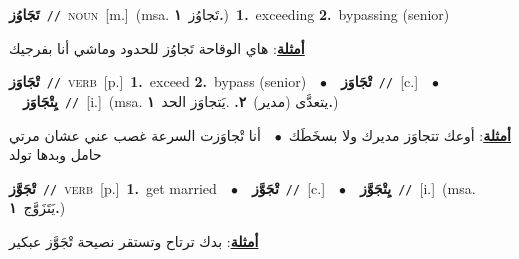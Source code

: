 \documentclass[10pt,a4paper,twoside]{article} %
\begin{document}
\begin{multicols}{2}
{\setlength\topsep{0pt}\textbf{\foreignlanguage{arabic}{تَجَاوُز}}\ {\color{gray}\texttt{//}\color{black}}\ \textsc{noun}\ [m.]\ \color{gray}(msa. \foreignlanguage{arabic}{تَجاوُز}~\foreignlanguage{arabic}{\textbf{١.}})\color{black}\ \textbf{1.}~exceeding  \textbf{2.}~bypassing (senior)\  \begin{flushright}\color{gray}\foreignlanguage{arabic}{\textbf{\underline{\foreignlanguage{arabic}{أمثلة}}}: هاي الوقاحة تَجاوُز للحدود وماشي أنا بفرجيك}\end{flushright}\color{black}} \vspace{2mm}

{\setlength\topsep{0pt}\textbf{\foreignlanguage{arabic}{تْجَاوَز}}\ {\color{gray}\texttt{//}\color{black}}\ \textsc{verb}\ [p.]\ \textbf{1.}~exceed  \textbf{2.}~bypass (senior)\ \ $\bullet$\ \ \setlength\topsep{0pt}\textbf{\foreignlanguage{arabic}{تْجَاوَز}}\ {\color{gray}\texttt{//}\color{black}}\ [c.]\ \ $\bullet$\ \ \setlength\topsep{0pt}\textbf{\foreignlanguage{arabic}{يِتْجَاوَز}}\ {\color{gray}\texttt{//}\color{black}}\ [i.]\ \color{gray}(msa. \foreignlanguage{arabic}{يتعدَّى (مدير)}~\foreignlanguage{arabic}{\textbf{٢.}}  .\foreignlanguage{arabic}{يَتجاوَز الحد}~\foreignlanguage{arabic}{\textbf{١.}})\color{black}\  \begin{flushright}\color{gray}\foreignlanguage{arabic}{\textbf{\underline{\foreignlanguage{arabic}{أمثلة}}}: أوعك تتجاوَز مديرك ولا بسخَطَك\ $\bullet$\ \  أنا تْجاوَزت السرعة غصب عني عشان مرتي حامل وبدها تولد}\end{flushright}\color{black}} \vspace{2mm}

{\setlength\topsep{0pt}\textbf{\foreignlanguage{arabic}{تْجَوَّز}}\ {\color{gray}\texttt{//}\color{black}}\ \textsc{verb}\ [p.]\ \textbf{1.}~get married\ \ $\bullet$\ \ \setlength\topsep{0pt}\textbf{\foreignlanguage{arabic}{تْجَوَّز}}\ {\color{gray}\texttt{//}\color{black}}\ [c.]\ \ $\bullet$\ \ \setlength\topsep{0pt}\textbf{\foreignlanguage{arabic}{يِتْجَوَّز}}\ {\color{gray}\texttt{//}\color{black}}\ [i.]\ \color{gray}(msa. \foreignlanguage{arabic}{يَتَزَوَّج}~\foreignlanguage{arabic}{\textbf{١.}})\color{black}\  \begin{flushright}\color{gray}\foreignlanguage{arabic}{\textbf{\underline{\foreignlanguage{arabic}{أمثلة}}}: بدك ترتاح وتستقر نصيحة تْجَوَّز عبكير}\end{flushright}\color{black}} \vspace{2mm}


\end{multicols}
\end{document}
